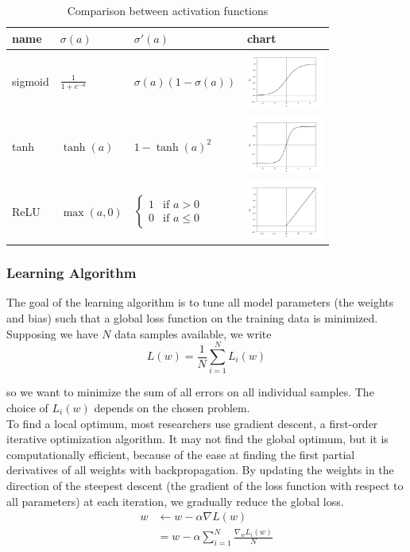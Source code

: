 \begin{table}[]
\centering
\begin{tabular}{m{2cm} m{2cm} m{4cm} m{2cm}}
\toprule
\textbf{name} & $\sigma (a)$ & $\sigma'(a)$ & \textbf{chart} \\
\midrule
sigmoid & $\frac{1}{1+e^{-a}}$ & $\sigma(a)(1-\sigma(a))$  &  \includegraphics[width=1in]{fig/sigmoid}  \\
tanh & $\tanh(a)$ & $1-\tanh(a)^{2}$&  \includegraphics[width=1in]{fig/tanh}        \\
ReLU & $\max(a,0) $ & 
$
  \begin{cases} 
   1 & \text{if } a > 0 \\
   0       & \text{if } a \leq 0
  \end{cases}
$      &  \includegraphics[width=1in]{fig/relu}          \\
\bottomrule
\end{tabular}
\caption[Comparison between activation functions]{Comparison between activation functions}
\label{tab:nonlin}
\end{table}

\subsubsection*{Learning Algorithm}
The goal of the learning algorithm is to tune all model parameters (the weights and bias) such that a global loss function on the training data is minimized. Supposing we have $N$ data samples available, we write 
\begin{equation}
L(w)=\frac{1}{N} \sum_{i=1}^{N} L_i(w)
\end{equation}

so we want to minimize the sum of all errors on all individual samples. The choice of $L_i(w)$ depends on the chosen problem.\\
To find a local optimum, most researchers use gradient descent, a first-order iterative optimization algorithm. It may not find the global optimum, but it is computationally efficient, because of the ease at finding the first partial derivatives of all weights with backpropagation. By updating the weights in the direction of the steepest descent (the gradient of the loss function with respect to all parameters) at each iteration, we gradually reduce the global loss.
\begin{align}
w &\leftarrow w-\alpha\nabla L(w) \\
&=w-\alpha\sum_{i=1}^{N}\frac{\nabla_w L_i(w)}{N}
\end{align}

